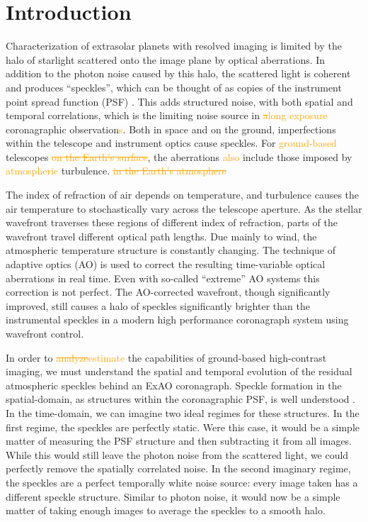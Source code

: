 \documentclass[10pt,preprint]{aastex631}
\newcommand{\ogadd}[1]{\textcolor{orange}{#1}}
\newcommand{\ogrmv}[1]{\textcolor{orange}{\sout{#1}}}
\begin{document}
\section{Introduction}
Characterization of extrasolar planets with resolved imaging is limited by the halo of starlight scattered onto the image plane by optical aberrations.  In addition to the photon noise caused by this halo, the scattered light is coherent and produces ``speckles'', which can be thought of as copies of the instrument point spread function (PSF) \citep{1995PASP..107..386M}.  This adds structured noise, with both spatial and temporal correlations, which is the limiting noise source in \ogrmv{a}\ogadd{long exposure} coronagraphic observation\ogadd{s}.    Both in space and on the ground, imperfections within the telescope and instrument optics cause speckles.   For \ogadd{ground-based} telescopes \ogrmv{on the Earth's surface}, the aberrations \ogadd{also} include those imposed by \ogadd{atmospheric} turbulence. \ogrmv{in the Earth's atmosphere}

The index of refraction of air depends on temperature, and turbulence causes the air temperature to stochastically vary across the telescope aperture.  As the stellar wavefront traverses these regions of different index of refraction, parts of the wavefront travel different optical path lengths.  Due mainly to wind, the atmospheric temperature structure is constantly changing.  The technique of adaptive optics (AO) is used to correct the resulting time-variable optical aberrations in real time.  Even with so-called ``extreme'' AO systems \citep[ExAO, ][]{2018ARAA..56..315G} this correction is not perfect.  The AO-corrected wavefront, though significantly improved, still causes a halo of speckles significantly brighter than the instrumental speckles in a modern high performance coronagraph system using wavefront control.

In order to \ogrmv{analyze}\ogadd{estimate} the capabilities of ground-based high-contrast imaging, we must understand the spatial and temporal evolution of the residual atmospheric speckles behind an ExAO coronagraph.  Speckle formation in the spatial-domain, as structures within the coronagraphic PSF, is well understood \citep{2001ApJ...558L..71B,2003ApJ...596..702P,2007ApJ...669..642S}.  In the time-domain, we can imagine two ideal regimes for these structures.  In the first regime, the speckles are perfectly static.  Were this case, it would be a simple matter of measuring the PSF structure and then subtracting it from all images.  While this would still leave the photon noise from the scattered light, we could perfectly remove the spatially correlated noise.  In the second imaginary regime, the speckles are a perfect temporally white noise source: every image taken has a different speckle structure.  Similar to photon noise, it would now be a simple matter of taking enough images to average the speckles to a smooth halo.
\end{document}
